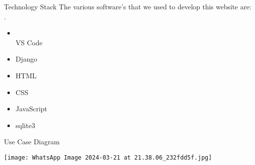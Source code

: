 \documentclass{beamer} %
\begin{document}
\begin{frame}{Technology Stack}
    The various software's that we used to develop this website are:\\.
    \begin{minipage}{1\textwidth}
            \begin{itemize}
                \item \\VS Code
                \item Django
                \item HTML
                \item CSS
                \item JavaScript
                \item sqlite3
            \end{itemize}
        \end{minipage} 
\end{frame}

\begin{frame}[c]{Use Case Diagram}	
\begin{usecase}
	\texttt{[image: WhatsApp Image 2024-03-21 at 21.38.06\_232fdd5f.jpg]}
 
\end{usecase}
\end{frame}	

               

%       
  
\end{document}
